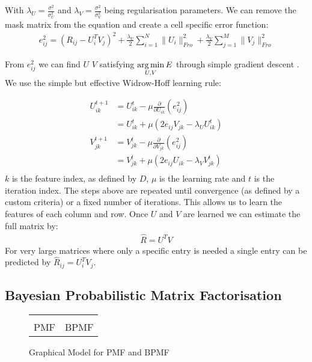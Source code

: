 With $\lambda_U = \frac{\sigma^2}{\sigma_U^2}$ and $\lambda_V = \frac{\sigma^2}{\sigma_V^2}$ being regularisation parameters. We can remove the mask matrix from the equation and create a cell specific error function:
\begin{align*}
e_{ij}^2= (R_{ij}-U_i^TV_j)^2 + \frac{\lambda_U}{2}\sum_{i=1}^{N} \|U_i\|_{Fro}^2 
+ \frac{\lambda_V}{2} \sum_{j=1}^{M} \|V_j\|_{Fro}^2
\end{align*}

From $e_{ij}^2$ we can find $U$ $V$ satisfying $\underset{U,V}{\operatorname*{arg\,min}} \, E$ through simple gradient descent \cite{nnmf-grad}. We use the simple but effective Widrow-Hoff learning rule:

\begin{align*}
U_{ik}^{t+1} &= U_{ik}^{t} - \mu \frac{\partial}{\partial U_{ik}}(e_{ij}^2) \\
&= U_{ik}^{t} + \mu (2 e_{ij}V_{jk} - \lambda_U  U_{ik}^{t})\\
V_{jk}^{t+1} &= V_{jk}^{t} - \mu \frac{\partial}{\partial V_{jk}}(e_{ij}^2) \\
&= V_{jk}^{t} + \mu (2 e_{ij}U_{ik} - \lambda_V  V_{jk}^{t})\\
\end{align*}
$k$ is the feature index, as defined by $D$, $\mu$ i{\tiny }s the learning rate and $t$ is the iteration index. The steps above are repeated until convergence (as defined by a custom criteria) or a fixed number of iterations. This allows us to learn the features of each column and row. Once $U$ and $V$ are learned we can estimate the full matrix by:
\begin{align}
\hat{R} = U^T V
\end{align}
For very large matrices where only a specific entry is needed a single entry can be predicted by $\hat{R}_{ij} = U_i^T V_j$.
\subsection{Bayesian Probabilistic Matrix Factorisation}
\label{sec:bpmf}
\begin{figure}[!ht]
  \begin{center}
    \begin{tabular}{cc}
       &
       \\
      PMF & BPMF
    \end{tabular}
  \end{center}
  \caption{Graphical Model for PMF and BPMF}
  \label{fig:bpmf_pmf_gm}
\end{figure}



